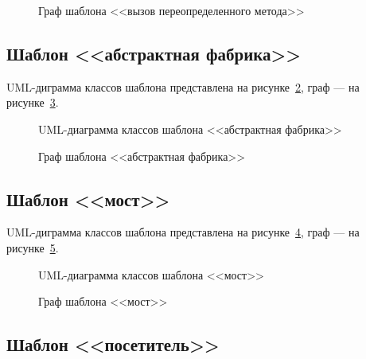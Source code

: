 \begin{figure}[!ht]
\centering
\caption{Граф шаблона <<вызов переопределенного метода>>}
\label{fig:overridden-method-call-graph}
\end{figure}

\subsection{Шаблон <<абстрактная фабрика>>}

UML-диграмма классов шаблона представлена на рисунке~\ref{fig:abstract-factory-uml},
граф --- на рисунке~\ref{fig:abstract-factory-graph}.

\begin{figure}[!ht]
\centering
\caption{UML-диаграмма классов шаблона <<абстрактная фабрика>>}
\label{fig:abstract-factory-uml}
\end{figure}

\begin{figure}[!ht]
\centering
\caption{Граф шаблона <<абстрактная фабрика>>}
\label{fig:abstract-factory-graph}
\end{figure}

\subsection{Шаблон <<мост>>}

UML-диграмма классов шаблона представлена на рисунке~\ref{fig:bridge-uml},
граф --- на рисунке~\ref{fig:bridge-graph}.

\begin{figure}[!ht]
\centering
\caption{UML-диаграмма классов шаблона <<мост>>}
\label{fig:bridge-uml}
\end{figure}

\begin{figure}[!ht]
\centering
\caption{Граф шаблона <<мост>>}
\label{fig:bridge-graph}
\end{figure}

\subsection{Шаблон <<посетитель>>}

